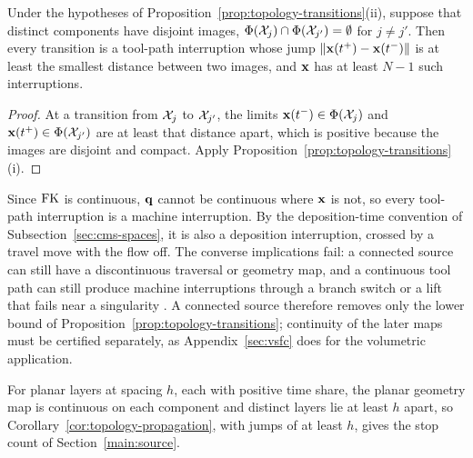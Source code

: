 \begin{corollary}
  \label{cor:topology-propagation}
  Under the hypotheses of Proposition~\ref{prop:topology-transitions}(ii), suppose that distinct components have disjoint images, $\Phi(\mathcal{X}_j)\cap\Phi(\mathcal{X}_{j'})=\emptyset$ for $j\neq j'$. Then every transition is a tool-path interruption whose jump $\|{\bm{\mathrm{x}}}(t^+)-{\bm{\mathrm{x}}}(t^-)\|$ is at least the smallest distance between two images, and ${\bm{\mathrm{x}}}$ has at least $N-1$ such interruptions.
\end{corollary}
\begin{proof}
  At a transition from $\mathcal{X}_j$ to $\mathcal{X}_{j'}$, the limits ${\bm{\mathrm{x}}}(t^-)\in\Phi(\mathcal{X}_j)$ and ${\bm{\mathrm{x}}}(t^+)\in\Phi(\mathcal{X}_{j'})$ are at least that distance apart, which is positive because the images are disjoint and compact. Apply Proposition~\ref{prop:topology-transitions}(i).
\end{proof}

Since $\operatorname{FK}$ is continuous, ${\bm{\mathrm{q}}}$ cannot be continuous where ${\bm{\mathrm{x}}}$ is not, so every tool-path interruption is a machine interruption. By the deposition-time convention of Subsection~\ref{sec:cms-spaces}, it is also a deposition interruption, crossed by a travel move with the flow off. The converse implications fail: a connected source can still have a discontinuous traversal or geometry map, and a continuous tool path can still produce machine interruptions through a branch switch or a lift that fails near a singularity \cite{yang2020coverage,zhang2021singularity}. A connected source therefore removes only the lower bound of Proposition~\ref{prop:topology-transitions}; continuity of the later maps must be certified separately, as Appendix~\ref{sec:vsfc} does for the volumetric application.

For planar layers at spacing $h$, each with positive time share, the planar geometry map is continuous on each component and distinct layers lie at least $h$ apart, so Corollary~\ref{cor:topology-propagation}, with jumps of at least $h$, gives the stop count of Section~\ref{main:source}.
